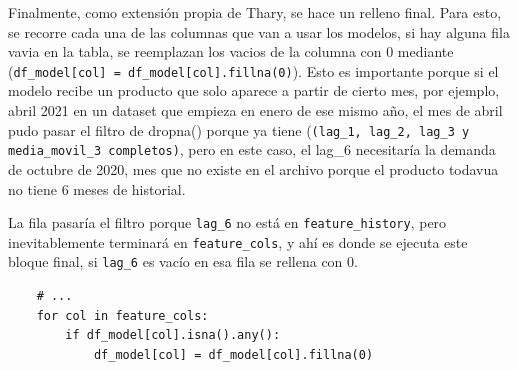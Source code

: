 Finalmente, como extensión propia de Thary, se hace un relleno final. Para esto, se recorre cada una de las columnas que van a usar los modelos, si hay alguna fila vavia en la tabla, se reemplazan los vacios de la columna con 0 mediante (\texttt{df\_model[col] = df\_model[col].fillna(0)}). Esto es importante porque si el modelo recibe un producto que solo aparece a partir de cierto mes, por ejemplo, abril 2021 en un dataset que empieza en enero de ese mismo año, el mes de abril pudo pasar el filtro de dropna() porque ya tiene (\texttt{(lag\_1, lag\_2, lag\_3 y media\_movil\_3 completos)}, pero en este caso, el lag\_6 necesitaría la demanda de octubre de 2020, mes que no existe en el archivo porque el producto todavua no tiene 6 meses de historial.

La fila pasaría el filtro porque \texttt{lag\_6} no está en \texttt{feature\_history}, pero inevitablemente terminará en \texttt{feature\_cols}, y ahí es donde se ejecuta este bloque final, si \texttt{lag\_6} es vacío en esa fila se rellena con 0.

\label{lst:features_relleno}
\begin{verbatim}
    # ...
    for col in feature_cols:
        if df_model[col].isna().any():
            df_model[col] = df_model[col].fillna(0)
\end{verbatim}
